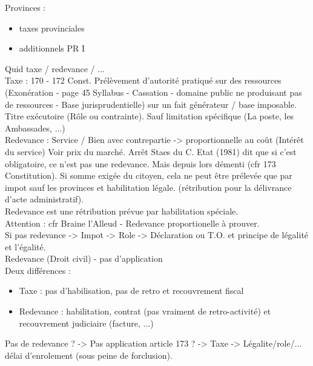 \documentclass{book}
\begin{document}
\null 

Provinces :\\

\begin{itemize}
\item taxes provinciales
\item additionnels PR I
\end{itemize}

\null

Quid taxe / redevance / ... \\

Taxe : 170 - 172 Const. Prélèvement d'autorité pratiqué sur des ressources (Exonération - page 45 Syllabus - Cassation - domaine public ne produisant pas de ressources - Base jurisprudentielle) sur un fait générateur / base imposable. Titre exécutoire (Rôle ou contrainte). Sauf limitation spécifique (La poste, les Ambassades, ...)\\

Redevance : Service / Bien avec contrepartie -> proportionnelle au coût (Intérêt du service) Voir prix du marché. Arrêt Staes du C. Etat (1981) dit que si c'est obligatoire, ce n'est pas une redevance. Mais depuis lors  démenti (cfr 173 Constitution). Si somme exigée du citoyen, cela ne peut être prélevée que par impot sauf les provinces et habilitation légale. (rétribution pour la délivrance d'acte administratif).\\

Redevance est une rétribution prévue par habilitation spéciale.\\

Attention : cfr Braine l'Alleud - Redevance proportionelle à prouver.\\

Si pas redevance -> Impot -> Role -> Déclaration ou T.O. et principe de légalité et l'égalité.\\

Redevance (Droit civil) - pas d'application \\

Deux différences : 
\begin{itemize}
\item Taxe : pas d'habilisation, pas de retro et recouvrement fiscal
\item Redevance : habilitation, contrat (pas vraiment de retro-activité) et recouvrement judiciaire (facture, ...)
\end{itemize}
\null
Pas de redevance ? -> Pas application article 173 ? -> Taxe -> Légalite/role/... délai d'enrolement (sous peine de forclusion).\\
\end{document}
